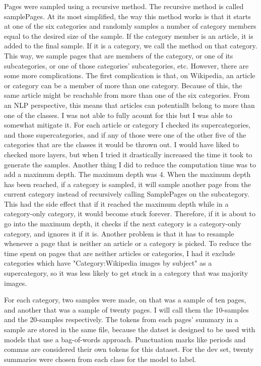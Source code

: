 \documentclass[11pt]{article}
\begin{document}
Pages were sampled using a recursive method. The recursive method is called samplePages. At its most simplified, the way this method works is that it starts at one of the six categories and randomly samples a number of category members equal to the desired size of the sample. If the category member is an article, it is added to the final sample. If it is a category, we call the method on that category. This way, we sample pages that are members of the category, or one of its subcategories, or one of those categories' subcategories, etc. However, there are some more complications. The first complication is that, on Wikipedia, an article or category can be a member of more than one category. Because of this, the same article might be reachable from more than one of the six categories. From an NLP perspective, this means that articles can potentiallt belong to more than one of the classes. I was not able to fully acount for this but I was able to somewhat mitigate it. For each article or category I checked its supercategories, and those supercategories, and if any of those were one of the other five of the categories that are the classes it would be thrown out. I would have liked to checked more layers, but when I tried it drastically increased the time it took to generate the samples. Another thing I did to reduce the computation time was to add a maximum depth. The maximum depth was 4. When the maximum depth has been reached, if a category is sampled, it will sample another page from the current category instead of recursively calling SamplePages on the subcategory. This had the side effect that if it reached the maximum depth while in a category-only category, it would become stuck forever. Therefore, if it is about to go into the maximum depth, it checks if the next category is a category-only category, and ignores it if it is. Another problem is that it has to resample whenever a page that is neither an article or a category is picked. To reduce the time spent on pages that are neither articles or categories, I had it exclude categories which have "Category:Wikipedia images by subject" as a supercategory, so it was less likely to get stuck in a category that was majority images.

For each category, two samples were made, on that was a sample of ten pages, and another that was a sample of twenty pages. I will call them the 10-samples and the 20-samples respectively. The tokens from each pages' summary in a sample are stored in the same file, because the datset is designed to be used with models that use a bag-of-words approach. Punctuation marks like periods and commas are considered their own tokens for this dataset. For the dev set, twenty summaries were chosen from each class for the model to label. 
\end{document}
